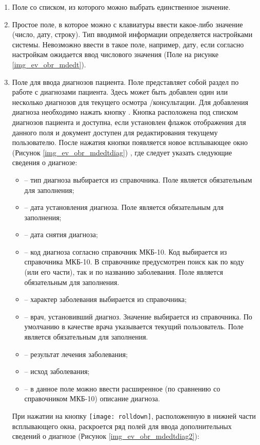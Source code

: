 \begin{enumerate}
 \item Поле со списком, из которого можно выбрать единственное значение.
 \item Простое поле, в которое можно с клавиатуры ввести какое-либо значение (число, дату, строку). Тип вводимой информации определяется настройками системы. Невозможно ввести в такое поле, например, дату, если согласно настройкам ожидается ввод числового значения (Поле  на рисунке \ref{img_ev_obr_mdedt}). 
 \item Поле для ввода диагнозов пациента. Поле представляет собой раздел по работе с диагнозами пациента. Здесь может быть добавлен один или несколько диагнозов для текущего осмотра \slash консультации. Для добавления диагноза необходимо нажать кнопку . Кнопка расположена под списком диагнозов пациента и доступна, если установлен флажок отображения для данного поля и документ доступен для редактирования текущему пользователю. После нажатия кнопки появляется новое всплывающее окно (Рисунок \ref{img_ev_obr_mdedtdiag}) , где следует указать следующие сведения о диагнозе: 
 \begin{itemize}
  \item {} -- тип диагноза выбирается из справочника. Поле является обязательным для заполнения;
  \item {} -- дата установления диагноза. Поле является обязательным для заполнения;
  \item {} -- дата снятия диагноза;
  \item {} -- код диагноза согласно справочник МКБ-10. Код выбирается из справочника МКБ-10. В справочнике предусмотрен поиск как по коду (или его части), так и по названию заболевания. Поле является обязательным для заполнения.
  \item {} -- характер заболевания выбирается из справочника;
  \item {} -- врач, установивший диагноз. Значение выбирается из справочника. По умолчанию в качестве врача указывается текущий пользователь. Поле является обязательным для заполнения.
  \item {} -- результат лечения заболевания;
  \item {} -- исход заболевания;
  \item {} -- в данное поле можно ввести расширенное (по сравнению со справочником МКБ-10) описание диагноза. 	  	 	    
 \end{itemize} 
 При нажатии на кнопку \texttt{[image: rolldown]}, расположенную в нижней части всплывающего окна, раскроется ряд полей для ввода дополнительных сведений о диагнозе (Рисунок \ref{img_ev_obr_mdedtdiag2}):

\end{enumerate}
